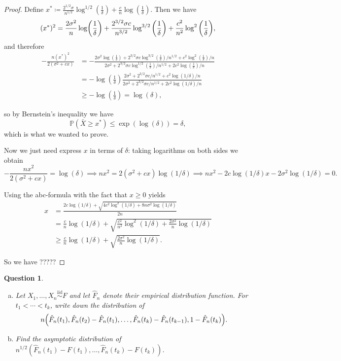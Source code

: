 \documentclass{article}
\theoremstyle{plain}
\newtheorem{question}{Question}
\theoremstyle{remark}
\newcommand{\Bb}{\mathbb}
\newcommand{\Rm}{\mathrm}
\newcommand{\PP}{\Bb P}
\newcommand\ceq\coloneqq %
\newcommand\iid{\overset{\Rm{iid}}{\sim}}
\begin{document}
\begin{proof}
	Define $x^* \ceq \frac{2^{1/2}\sigma}{n^{1/2}} \log^{1/2}(\frac1\delta) + \frac cn \log(\frac 1\delta)$. Then we have
	\[
	(x^*)^2 = \frac{2\sigma^2}{n}\log(\frac1\delta) + \frac{2^{3/2}\sigma c}{n^{3/2}} \log^{3/2}\qty(\frac1\delta) + \frac{c^2}{n^2} \log^2\qty(\frac1\delta),
	\]
	and therefore
	\begin{align*}
	-\frac{n(x^*)^2}{2(\sigma^2 + cx)} &= - \frac{2\sigma^2 \log(\frac1\delta) + 2^{3/2}\sigma c \log^{3/2}(\frac1\delta)/n^{1/2} + c^2 \log^2(\frac1\delta)/n}{2\sigma^2 + 2^{3/2} \sigma c \log^{1/2}(\frac1\delta)/n^{1/2} + 2c^2\log(\frac1\delta)/n} \\
	&= -\log(\frac1\delta) \frac{2\sigma^2 + 2^{3/2} \sigma c/n^{1/2} + c^2\log(1/\delta)/n}{2\sigma^2 + 2^{3/2} \sigma c/n^{1/2} + 2c^2\log(1/\delta)/n} \\
	&\geq -\log(\frac1\delta) = \log(\delta),
	\end{align*}
	
	so by Bernstein's inequality we have
	\[
	\PP(\bar X \geq x^*) \leq \exp(\log(\delta)) = \delta, 
	\]
	which is what we wanted to prove. 
	

	Now we just need express $x$ in terms of $\delta$: taking logarithms on both sides we obtain
	\[
	- \frac{nx^2}{2(\sigma^2 + cx)} = \log(\delta) \implies nx^2 = 2(\sigma^2 + cx) \log(1/\delta) \implies nx^2 - 2c\log(1/\delta) x - 2\sigma^2\log(1/\delta) = 0.
	\]
	
	Using the abc-formula with the fact that $x \geq 0$ yields 
	\begin{align*}
	x &= \frac{2c \log(1/\delta) + \sqrt{4c^2\log^2(1/\delta) + 8n\sigma^2\log(1/\delta)}}{2n} \\
	&= \frac cn \log(1/\delta) + \sqrt{\frac{c^2}{n^2}\log^2(1/\delta) + \frac{2\sigma^2}{n} \log(1/\delta)} \\
	&\geq \frac cn \log(1/\delta) + \sqrt{\frac{2\sigma^2}{n} \log(1/\delta)}. 
	\end{align*}

So we have ?????
\end{proof}

\begin{question}
	\begin{enumerate}[(a)]
		\item Let $X_1, \dotsc, X_n \iid F$ and let $\hat F_n$ denote their empirical distribution function. For $t_1 < \dotsb < t_k$, write down the distribution of 
		\[
		n\qty(\hat F_n(t_1), \hat F_n(t_2) - \hat F_n(t_1), \dotsc, \hat F_n(t_k) - \hat F_n(t_{k-1}), 1 - \hat F_n(t_k)). 
		\]
		\item Find the asymptotic distribution of $n^{1/2} (\hat F_n(t_1) - F(t_1), \dotsc, \hat F_n(t_k) - F(t_k))$. 
	\end{enumerate}
\end{question}
\end{document}
